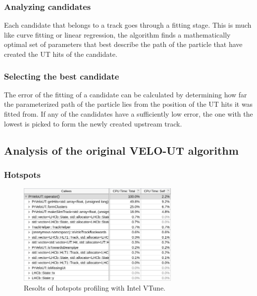 \documentclass[12pt]{article}
\begin{document}
\subsubsection{Analyzing candidates}

Each candidate that belongs to a track goes through a fitting stage. This is much like curve fitting or linear regression, the algorithm finds a mathematically optimal set of parameters that best describe the path of the particle that have created the UT hits of the candidate. 


\subsubsection{Selecting the best candidate}

The error of the fitting of a candidate can be calculated by determining how far the parameterized path of the particle lies from the position of the UT hits it was fitted from. If any of the candidates have a sufficiently low error, the one with the lowest is picked to form the newly created upstream track.


\subsection{Analysis of the original VELO-UT algorithm}

\subsubsection{Hotspots}

\begin{figure}[H]
	\begin{center}
		\includegraphics[width=0.7\textwidth]{velout_hotspots_orig}
	\end{center}
	\caption{Resolts of hotspots profiling with Intel VTune.}
	\label{fig_velout_hotspots_orig}
\end{figure}
\end{document}
